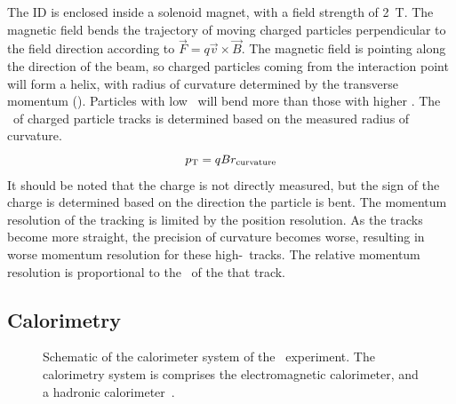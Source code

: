 The ID is enclosed inside a solenoid magnet, with a field strength of 2~T.
The magnetic field bends the trajectory of moving charged particles
perpendicular to the field direction according to
$\vec{F} = q \vec{v}\times \vec{B}$.
The magnetic field is pointing along the direction of the beam, so charged
particles coming from the interaction point will form a helix, with radius
of curvature determined by the transverse momentum (\pt).
Particles with low \pt\ will bend more than those with higher \pt.
The \pt\ of charged particle tracks is determined based on the measured radius
of curvature.
\begin{equation}
  p_{\mathrm{T}} = qBr_\mathrm{curvature}
\end{equation}
It should be noted that the charge is not directly measured, but the sign of
the charge is determined based on the direction the particle is bent.
The momentum resolution of the tracking is limited by the position resolution.
As the tracks become more straight, the precision of curvature becomes worse,
resulting in worse momentum resolution for these high-\pt\ tracks.
The relative momentum resolution is proportional to the \pt\ of the that track.

\FloatBarrier
\subsection{Calorimetry} 
\label{sec:calo}

\begin{figure}[ht]
  \caption[
    Schematic of the calorimeter system of the
    \atlas\ experiment~\cite{cern-jinst-atlas}.
  ]{
    Schematic of the calorimeter system of the
    \atlas\ experiment.
    The calorimetry system is comprises the electromagnetic calorimeter,
    and a hadronic calorimeter~\cite{cern-jinst-atlas}.
  }
  \label{fig:calo_cartoon}
\end{figure}

